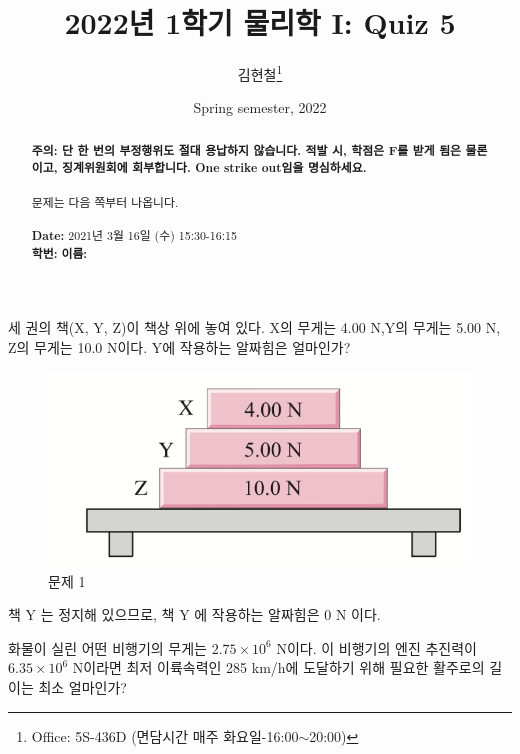 \documentclass[floatfix,nofootinbib,superscriptaddress,fleqn,preprint]{revtex4}
\begin{document}
\title{\Large 2022년 1학기 물리학 I: Quiz 5}
\author{김현철\footnote{Office: 5S-436D (면담시간 매주
    화요일-16:00$\sim$20:00)}} 
\date{Spring semester, 2022}


\vspace{1.cm}
\begin{abstract}
\noindent \textbf{ {\color{red}주의}: \color{blue} 단 한 번의 부정행위도 절대
  용납하지 않습니다. 적발 시, 학점은 F를 받게 됨은 물론이고,
  징계위원회에 회부합니다. One strike out임을 명심하세요.}\\
\\
문제는 다음 쪽부터 나옵니다.  \\ \\
{\bf Date:} 2021년 3월 16일 (수) 15:30-16:15 
\\
{\bf 학번:} \hspace{4cm}
{\bf 이름:} 

\end{abstract}
\maketitle

세 권의 책(X, Y, Z)이 책상 위에 놓여 있다. X의
무게는 4.00 N,Y의 무게는 5.00 N, Z의 무게는 10.0 N이다. Y에 작용하는
알짜힘은 얼마인가? 
\begin{figure}[ht]
  \centering
\includegraphics[scale=0.6]{Qfig5-1.pdf}  
  \caption{문제 1}
  \label{fig:1}
\end{figure}

책 Y 는 정지해 있으므로, 책 Y 에 작용하는 알짜힘은 0 N 이다.

\vspace{2cm}

화물이 실린 어떤 비행기의 무게는 $2.75\times
10^6$ N이다. 이 비행기의 엔진 추진력이 $6.35\times10^6$ N이라면 최저
이륙속력인 285 km/h에 도달하기 위해 필요한 활주로의 길이는 최소
얼마인가?  
\end{document}

